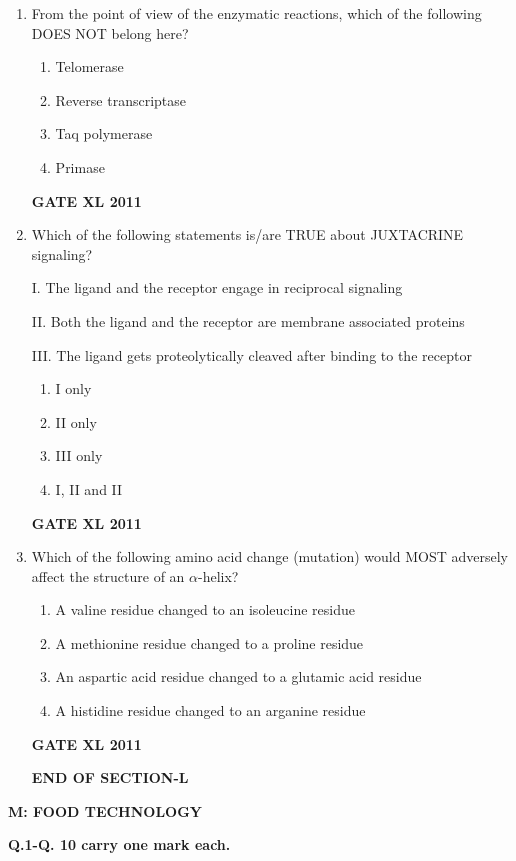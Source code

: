 \documentclass[journal,12pt,onecolumn]{IEEEtran}
\begin{document}
\begin{enumerate}
\item {From the point of view of the enzymatic reactions, which of the following DOES NOT belong here?}

\begin{enumerate}
	\item Telomerase
	\item Reverse transcriptase
	\item Taq polymerase
	\item Primase
\end{enumerate}
\hfill{\textbf{GATE XL 2011}}

\item{ Which of the following statements is/are TRUE about JUXTACRINE signaling?

I. The ligand and the receptor engage in reciprocal signaling

II. Both the ligand and the receptor are membrane associated proteins

III. The ligand gets proteolytically cleaved after binding to the receptor}

\begin{enumerate}
	\item I only
	\item II only
	\item III only
	\item I, II and II
\end{enumerate}
\hfill{\textbf{GATE XL 2011}}

\item{ Which of the following amino acid change (mutation) would MOST adversely affect the structure of an $\alpha$-helix?}
\begin{enumerate}
	\item A valine residue changed to an isoleucine residue 
	\item A methionine residue changed to a proline residue
	\item An aspartic acid residue changed to a glutamic acid residue
	\item A histidine residue changed to an arganine residue
\end{enumerate}
\hfill{\textbf{GATE XL 2011}}

\begin{center}
\textbf{END OF SECTION-L}
\end{center}
\end{enumerate}
\newpage
\textbf{M: FOOD TECHNOLOGY}

		\textbf{Q.1-Q. 10 carry one mark each.}
\end{document}
